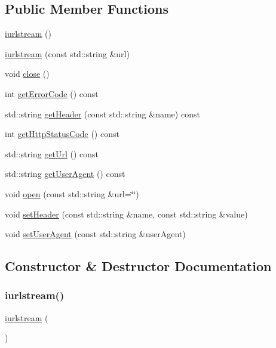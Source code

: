 \subsection*{Public Member Functions}
\begin{DoxyCompactItemize}
\item 
\mbox{\hyperlink{classiurlstream_aa78011981facda77bed9acf0e88ebdab}{iurlstream}} ()
\item 
\mbox{\hyperlink{classiurlstream_a5fa5ba70cbe8c2ad3f93876c381464cb}{iurlstream}} (const std\+::string \&url)
\item 
void \mbox{\hyperlink{classiurlstream_a5ae591df94fc66ccb85cbb6565368bca}{close}} ()
\item 
int \mbox{\hyperlink{classiurlstream_a9e79924a3e50273b08ab5b3a8c12a221}{get\+Error\+Code}} () const
\item 
std\+::string \mbox{\hyperlink{classiurlstream_a736d777b29179f52ba753317d84b1087}{get\+Header}} (const std\+::string \&name) const
\item 
int \mbox{\hyperlink{classiurlstream_ab6c069ef77f1319830dcfd90eed6a2ce}{get\+Http\+Status\+Code}} () const
\item 
std\+::string \mbox{\hyperlink{classiurlstream_a0cbda75589e2fb500bbe875b72f66682}{get\+Url}} () const
\item 
std\+::string \mbox{\hyperlink{classiurlstream_a479f109234aad1c792be804bf6320c62}{get\+User\+Agent}} () const
\item 
void \mbox{\hyperlink{classiurlstream_a9759fd1c1bf1427fa02340c2dabd47d6}{open}} (const std\+::string \&url=\char`\"{}\char`\"{})
\item 
void \mbox{\hyperlink{classiurlstream_af7065da3945b84ffb547b8bad9ddf8dc}{set\+Header}} (const std\+::string \&name, const std\+::string \&value)
\item 
void \mbox{\hyperlink{classiurlstream_a766286050e9b8fe08919f8353ecb4031}{set\+User\+Agent}} (const std\+::string \&user\+Agent)
\end{DoxyCompactItemize}


\subsection{Constructor \& Destructor Documentation}
\mbox{\label{classiurlstream_aa78011981facda77bed9acf0e88ebdab}} 
\subsubsection{\texorpdfstring{iurlstream()}{iurlstream()}\hspace{0.1cm}{\footnotesize\ttfamily [1/2]}}
{\footnotesize\ttfamily \mbox{\hyperlink{classiurlstream}{iurlstream}} (\begin{DoxyParamCaption}{ }\end{DoxyParamCaption})}


